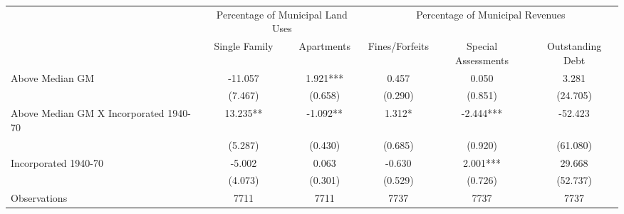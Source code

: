  \begin{tabular}{l*{5}{c}} \toprule
                    &\multicolumn{2}{c}{Percentage of Municipal Land Uses}&\multicolumn{3}{c}{Percentage of Municipal Revenues}\\\cmidrule(lr){2-3}\cmidrule(lr){4-6}
                    &\multicolumn{1}{c}{Single Family}&\multicolumn{1}{c}{Apartments}&\multicolumn{1}{c}{Fines/Forfeits}&\multicolumn{1}{c}{Special Assessments}&\multicolumn{1}{c}{Outstanding Debt}\\
\midrule
Above Median GM     &     -11.057   &       1.921***&       0.457   &       0.050   &       3.281   \\
                    &     (7.467)   &     (0.658)   &     (0.290)   &     (0.851)   &    (24.705)   \\
\addlinespace
Above Median GM X Incorporated 1940-70&      13.235** &      -1.092** &       1.312*  &      -2.444***&     -52.423   \\
                    &     (5.287)   &     (0.430)   &     (0.685)   &     (0.920)   &    (61.080)   \\
\addlinespace
Incorporated 1940-70&      -5.002   &       0.063   &      -0.630   &       2.001***&      29.668   \\
                    &     (4.073)   &     (0.301)   &     (0.529)   &     (0.726)   &    (52.737)   \\
\midrule
Observations        &        7711   &        7711   &        7737   &        7737   &        7737   \\
 \bottomrule \end{tabular}
